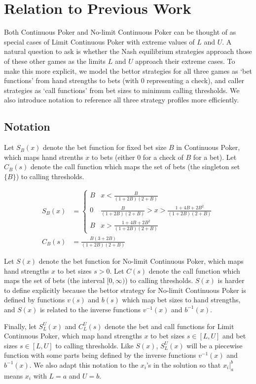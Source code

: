 \documentclass[a4paper,12pt]{article}
\theoremstyle{plain}
\theoremstyle{definition}
\begin{document}
\section{Relation to Previous Work}

Both Continuous Poker and No-limit Continuous Poker can be thought of as special cases of Limit Continuous Poker with extreme values of $L$ and $U$. A natural question to ask is whether the Nash equilibrium strategies approach those of these other games as the limits $L$ and $U$ approach their extreme cases. To make this more explicit, we model the bettor strategies for all three games as ‘bet functions’ from hand strengths to bets (with 0 representing a check), and caller strategies as ‘call functions’ from bet sizes to minimum calling thresholds. We also introduce notation to reference all three strategy profiles more efficiently.

\subsection{Notation}

Let $S_B(x)$ denote the bet function for fixed bet size $B$ in Continuous Poker, which maps hand strenths $x$ to bets (either $0$ for a check of $B$ for a bet). Let $C_B(s)$ denote the call function which maps the set of bets (the singleton set $\{B\}$) to calling thresholds. 

\begin{align}
	S_B(x) & = \begin{cases}
    B & x < \frac{B}{(1+2B)(2+B)}\\
    0 & \frac{B}{(1+2B)(2+B)} > x > \frac{1 + 4B + 2B^2}{(1+2B)(2+B)}\\
    B & x > \frac{1 + 4B + 2B^2}{(1+2B)(2+B)}
\end{cases} \\
C_B(s) & = \frac{B(3 +2B)}{(1+2B)(2+B)}
\end{align}

Let $S(x)$ denote the bet function for No-limit Continuous Poker, which maps hand strengths $x$ to bet sizes $s > 0$. Let $C(s)$ denote the call function which maps the set of bets (the interval $[0, \infty)$) to calling thresholds. $S(x)$ is harder to define explicitly because the bettor strategy for No-limit Continuous Poker is defined by functions $v(s)$ and $b(s)$ which map bet sizes to hand strengths, and $S(x)$ is related to the inverse functions $v^{-1}(x)$ and $b^{-1}(x)$. 

Finally, let $S_L^U(x)$ and $C_L^U(s)$ denote the bet and call functions for Limit Continuous Poker, which map hand strengths $x$ to bet sizes $s \in [L, U]$ and bet sizes $s \in [L, U]$ to calling thresholds. Like $S(x)$, $S_L^U(x)$ will be a piecewise function with some parts being defined by the inverse functions $v^{-1}(x)$ and $b^{-1}(x)$. We also adapt this notation to the $x_i$'s in the solution so that $x_i|_a^b$ means $x_i$ with $L=a$ and $U=b$.
\end{document}
